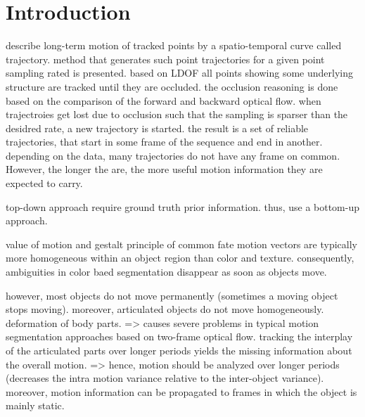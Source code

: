 


\chapter{Introduction}

describe long-term motion of tracked points by a spatio-temporal curve called trajectory.
method that generates such point trajectories for a given point sampling rated is presented. 
based on LDOF all points showing some underlying structure are tracked until they are occluded. the occlusion reasoning is done based on the comparison of the forward and backward optical flow. when trajectroies get lost due to occlusion such that the sampling is sparser than the desidred rate, a new trajectory is started. the result is a set of reliable trajectories, that start in some frame of the sequence and end in another. depending on the data, many trajectories do not have any frame on common. However, the longer the are, the more useful motion information they are expected to carry. 

top-down approach require ground truth prior information.
thus, use a bottom-up approach.

value of motion and gestalt principle of common fate
motion vectors are typically more homogeneous within an object region than color and texture. consequently, ambiguities in color baed segmentation disappear as soon as objects move.

however, most objects do not move permanently (sometimes a moving object stops moving). moreover, articulated objects do not move homogeneously. deformation of body parts.
=> causes severe problems in typical motion segmentation approaches based on two-frame optical flow.
tracking the interplay of the articulated parts over longer periods yields the missing information about the overall motion.
=> hence, motion should be analyzed over longer periods (decreases the intra motion variance relative to the inter-object variance). moreover, motion information can be propagated to frames in which the object is mainly static.

